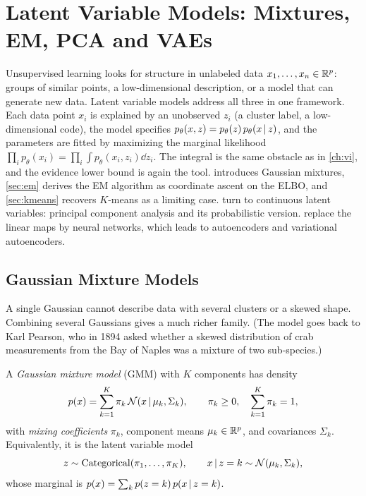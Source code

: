 \chapter{Latent Variable Models: Mixtures, EM, PCA and VAEs}\label{ch:latent}

Unsupervised learning looks for structure in unlabeled data $x_1,\dots,x_n\in\mathbb{R}^p$: groups of similar points, a low-dimensional description, or a model that can generate new data. Latent variable models address all three in one framework. Each data point $x_i$ is explained by an unobserved $z_i$ (a cluster label, a low-dimensional code), the model specifies $p_\theta(x,z)=p_\theta(z)\,p_\theta(x\,|\, z)$, and the parameters are fitted by maximizing the marginal likelihood $\prod_ip_\theta(x_i)=\prod_i\int p_\theta(x_i,z_i)\dd z_i$. The integral is the same obstacle as in \cref{ch:vi}, and the evidence lower bound is again the tool.  introduces Gaussian mixtures, \cref{sec:em} derives the EM algorithm as coordinate ascent on the ELBO, and \cref{sec:kmeans} recovers $K$-means as a limiting case.  turn to continuous latent variables: principal component analysis and its probabilistic version.  replace the linear maps by neural networks, which leads to autoencoders and variational autoencoders.

\section{Gaussian Mixture Models}\label{sec:gmm}

A single Gaussian cannot describe data with several clusters or a skewed shape. Combining several Gaussians gives a much richer family. (The model goes back to Karl Pearson, who in 1894 asked whether a skewed distribution of crab measurements from the Bay of Naples was a mixture of two sub-species.)

\begin{definition}\label{def:gmm}
A \emph{Gaussian mixture model} (GMM) with $K$ components has density
\[
p(x)=\sum_{k=1}^K\pi_k\,\mathcal{N}(x\,|\,\mu_k,\Sigma_k),\qquad \pi_k\ge0,\quad\sum_{k=1}^K\pi_k=1,
\]
with \emph{mixing coefficients} $\pi_k$, component means $\mu_k\in\mathbb{R}^p$, and covariances $\Sigma_k$. Equivalently, it is the latent variable model
\[
z\sim\mathrm{Categorical}(\pi_1,\dots,\pi_K),\qquad x\,|\, z=k\sim\mathcal{N}(\mu_k,\Sigma_k),
\]
whose marginal is $p(x)=\sum_kp(z=k)\,p(x\,|\, z=k)$.
\end{definition}

